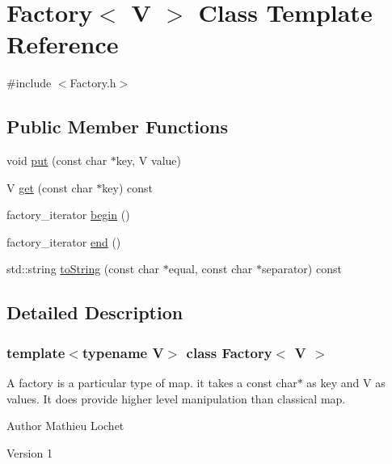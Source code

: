\hypertarget{classFactory}{}\section{Factory$<$ V $>$ Class Template Reference}
\label{classFactory}


{\ttfamily \#include $<$Factory.\+h$>$}

\subsection*{Public Member Functions}
\begin{DoxyCompactItemize}
\item 
void \mbox{\hyperlink{classFactory_adeaad06fb30141096cc92f98cc3dffa1}{put}} (const char $\ast$key, V value)
\item 
V \mbox{\hyperlink{classFactory_a8a13e5edc3e0c102a1e2fb85047e99d8}{get}} (const char $\ast$key) const
\item 
factory\+\_\+iterator \mbox{\hyperlink{classFactory_a3ea08050cb96078e9d9624de4220d517}{begin}} ()
\item 
factory\+\_\+iterator \mbox{\hyperlink{classFactory_a8b583450f222b426ba2212365f49638f}{end}} ()
\item 
std\+::string \mbox{\hyperlink{classFactory_a3bb49eea6ec1a75fbe7a8c601f27917d}{to\+String}} (const char $\ast$equal, const char $\ast$separator) const
\end{DoxyCompactItemize}


\subsection{Detailed Description}
\subsubsection*{template$<$typename V$>$\newline
class Factory$<$ V $>$}

A factory is a particular type of map. it takes a const char$\ast$ as key and V as values. It does provide higher level manipulation than classical map.

\begin{DoxyAuthor}{Author}
Mathieu Lochet 
\end{DoxyAuthor}
\begin{DoxyVersion}{Version}
1 
\end{DoxyVersion}


